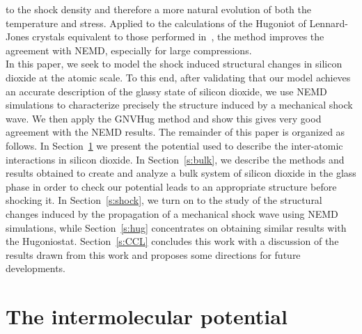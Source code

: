 \documentclass[aps,10pt,twocolumn]{revtex4}
\begin{document}
to the shock density and therefore a more natural evolution of both the  temperature and stress.
Applied to the calculations of the Hugoniot of Lennard-Jones crystals equivalent to those
performed in~\cite{MailletMareschal00}, the method improves the agreement with NEMD, especially
for large compressions.\\  
In this paper, we seek to model the shock induced structural changes in silicon dioxide at the
atomic scale. To this end, after validating that our model achieves an accurate description of
the glassy state of silicon dioxide, we use NEMD simulations to characterize precisely the structure
induced by a mechanical shock wave. We then apply the GNVHug method and show this gives very good agreement
with the NEMD results. The remainder of this paper is organized as follows. In
Section~\ref{s:potential} we present the potential used to describe the inter-atomic
interactions in silicon dioxide. In
Section~\ref{s:bulk}, we describe the methods and results  obtained to create and analyze a
bulk system of silicon dioxide in the glass phase in order to check our potential leads to an
appropriate structure before shocking it. In Section~\ref{s:shock}, we turn on to the study of
the structural changes induced by the propagation of a mechanical shock wave using NEMD simulations, while
Section~\ref{s:hug} concentrates on obtaining similar results with the Hugoniostat. 
Section~\ref{s:CCL} concludes this work with a discussion of the results drawn from this work
and proposes some directions for future developments.

\section{The intermolecular potential}
\label{s:potential}
\end{document}
